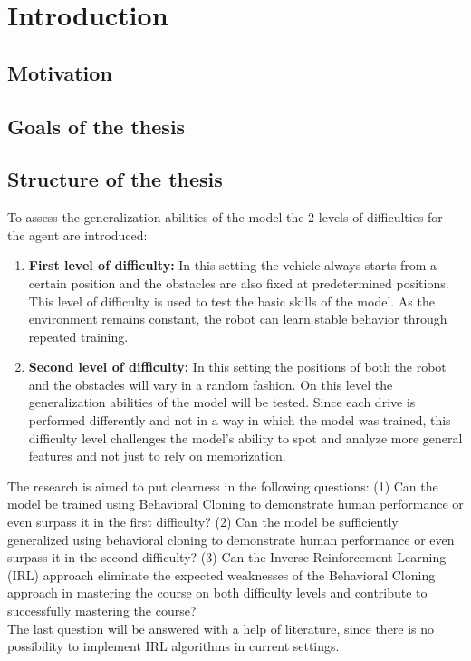 \chapter{Introduction}
\label{cha:Introduction}

\section{Motivation}

\section{Goals of the thesis}

\section{Structure of the thesis}

To assess the generalization abilities of the model the 2 levels of difficulties for the agent are introduced:
\begin{enumerate}
  \item \textbf{First level of difficulty:} In this setting the vehicle always starts from a certain position and the obstacles are also fixed at predetermined positions. This level of difficulty is used to test the basic skills of the model. As the environment remains constant, the robot can learn stable behavior through repeated training.
  \item \textbf{Second level of difficulty:} In this setting the positions of both the robot and the obstacles will vary in a random fashion. On this level the generalization abilities of the model will be tested. Since each drive is performed differently and not in a way in which the model was trained, this difficulty level challenges the model's ability to spot and analyze more general features and not just to rely on memorization.
\end{enumerate}

The research is aimed to put clearness in the following questions: (1) Can the model be trained using Behavioral Cloning \autocite{8855753} to demonstrate human performance or even surpass it in the first difficulty? (2) Can the model be sufficiently generalized using behavioral cloning to demonstrate human performance or even surpass it in the second difficulty? (3) Can the Inverse Reinforcement Learning (IRL) \autocite{ng2000algorithms} \autocite{neu2012apprenticeshiplearningusinginverse} \autocites{lee2021approximateinversereinforcementlearning} approach eliminate the expected weaknesses of the Behavioral Cloning approach in mastering the course on both difficulty levels and contribute to successfully mastering the course? \\
The last question will be answered with a help of literature, since there is no possibility to implement IRL algorithms in current settings.